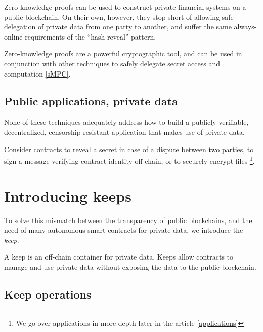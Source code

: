 \documentclass[11pt]{article}
\begin{document}
Zero-knowledge proofs can be used to construct private financial
systems on a public blockchain. On their own, however, they stop short
of allowing safe delegation of private data from one party to another,
and suffer the same always-online requirements of the ``hash-reveal''
pattern.

Zero-knowledge proofs are a powerful cryptographic tool, and can be
used in conjunction with other techniques to safely delegate secret
access and computation \ref{sMPC}.

\subsection{Public applications, private data}

None of these techniques adequately address how to build a publicly
verifiable, decentralized, censorship-resistant application that makes
use of private data.

Consider contracts to reveal a secret in case of a dispute between two
parties, to sign a message verifying contract identity off-chain, or
to securely encrypt files \footnote{We go over applications in more
depth later in the article \ref{applications}}.

\section{Introducing keeps}

To solve this mismatch between the transparency of public blockchains,
and the need of many autonomous smart contracts for private data, we
introduce the {\em keep}.

A keep is an off-chain container for private data. Keeps allow
contracts to manage and use private data without exposing the data to
the public blockchain.

\subsection{Keep operations}
\end{document}
